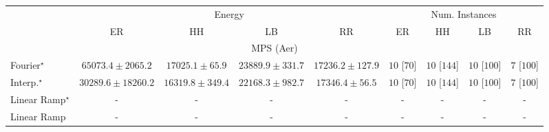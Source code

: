 \begin{tabular}{l|cccc|cccc|}
\toprule
& \multicolumn{4}{c|}{Energy} & \multicolumn{4}{c|}{Num. Instances} \\
            & ER & HH & LB & RR & ER & HH & LB & RR \\
\midrule
\multicolumn{9}{c}{\rule{0pt}{8pt}MPS (Aer)} \\
\midrule
Fourier$^\star$ & {\cellcolor[HTML]{740B70}} \color[HTML]{F1F1F1} $65073.4\pm 2065.2$ & {\cellcolor[HTML]{A9C4DE}} \color[HTML]{000000} $17025.1\pm 65.9$ & {\cellcolor[HTML]{98B0D3}} \color[HTML]{000000} $23889.9\pm 331.7$ & {\cellcolor[HTML]{A8C3DE}} \color[HTML]{000000} $17236.2\pm 127.9$ & {\cellcolor[HTML]{49006A}} \color[HTML]{F1F1F1} $10$ [$70$] & {\cellcolor[HTML]{49006A}} \color[HTML]{F1F1F1} $10$ [$144$] & {\cellcolor[HTML]{49006A}} \color[HTML]{F1F1F1} $10$ [$100$] & {\cellcolor[HTML]{CD238F}} \color[HTML]{F1F1F1} $7$ [$100$] \\
Interp.$^\star$ & {\cellcolor[HTML]{8D98C7}} \color[HTML]{F1F1F1} $30289.6\pm 18260.2$ & {\cellcolor[HTML]{ABC5DF}} \color[HTML]{000000} $16319.8\pm 349.4$ & {\cellcolor[HTML]{9BB6D7}} \color[HTML]{000000} $22168.3\pm 982.7$ & {\cellcolor[HTML]{A8C3DE}} \color[HTML]{000000} $17346.4\pm 56.5$ & {\cellcolor[HTML]{49006A}} \color[HTML]{F1F1F1} $10$ [$70$] & {\cellcolor[HTML]{49006A}} \color[HTML]{F1F1F1} $10$ [$144$] & {\cellcolor[HTML]{49006A}} \color[HTML]{F1F1F1} $10$ [$100$] & {\cellcolor[HTML]{CD238F}} \color[HTML]{F1F1F1} $7$ [$100$] \\
Linear Ramp$^\star$ & {\cellcolor[HTML]{000000}} \color[HTML]{F1F1F1} {\cellcolor{white}} \color{black} - & {\cellcolor[HTML]{000000}} \color[HTML]{F1F1F1} {\cellcolor{white}} \color{black} - & {\cellcolor[HTML]{000000}} \color[HTML]{F1F1F1} {\cellcolor{white}} \color{black} - & {\cellcolor[HTML]{000000}} \color[HTML]{F1F1F1} {\cellcolor{white}} \color{black} - & {\cellcolor[HTML]{000000}} \color[HTML]{F1F1F1} {\cellcolor{white}} \color{black} - & {\cellcolor[HTML]{000000}} \color[HTML]{F1F1F1} {\cellcolor{white}} \color{black} - & {\cellcolor[HTML]{000000}} \color[HTML]{F1F1F1} {\cellcolor{white}} \color{black} - & {\cellcolor[HTML]{000000}} \color[HTML]{F1F1F1} {\cellcolor{white}} \color{black} - \\
Linear Ramp & {\cellcolor[HTML]{000000}} \color[HTML]{F1F1F1} {\cellcolor{white}} \color{black} - & {\cellcolor[HTML]{000000}} \color[HTML]{F1F1F1} {\cellcolor{white}} \color{black} - & {\cellcolor[HTML]{000000}} \color[HTML]{F1F1F1} {\cellcolor{white}} \color{black} - & {\cellcolor[HTML]{000000}} \color[HTML]{F1F1F1} {\cellcolor{white}} \color{black} - & {\cellcolor[HTML]{000000}} \color[HTML]{F1F1F1} {\cellcolor{white}} \color{black} - & {\cellcolor[HTML]{000000}} \color[HTML]{F1F1F1} {\cellcolor{white}} \color{black} - & {\cellcolor[HTML]{000000}} \color[HTML]{F1F1F1} {\cellcolor{white}} \color{black} - & {\cellcolor[HTML]{000000}} \color[HTML]{F1F1F1} {\cellcolor{white}} \color{black} - \\

\end{tabular}

